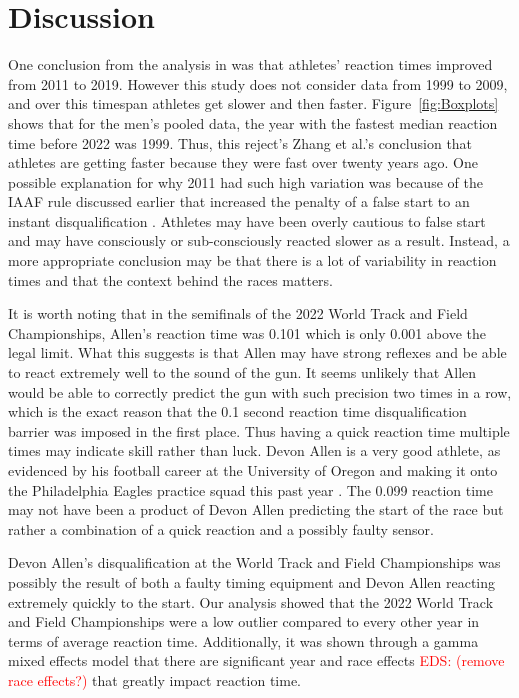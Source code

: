 \documentclass[12pt, letterpaper, titlepage]{article}
\newcommand{\eds}[1]{\textcolor{red}{EDS: (#1)}}
\begin{document}
\section{Discussion}\label{sec:Discussion}

One conclusion from the analysis in \citet{zhang2021correlation} was that 
athletes'
reaction times improved from 2011 to 2019.  However this study does not consider 
data from 1999 to 2009, and over this timespan athletes get slower and then
faster.  Figure~\ref{fig:Boxplots} shows that for the men's pooled data, the 
year with the fastest median reaction time before 2022 was 1999.  Thus, this 
reject's Zhang et al.'s conclusion that athletes are getting faster because they 
were 
fast over twenty years ago. One possible explanation for why 2011 had such
high variation was because of the IAAF rule discussed earlier that increased the
penalty of a false start to an instant disqualification \citep{iaaf2009falsestart}.
Athletes may have been overly cautious to false start and may have consciously
or sub-consciously reacted slower as a result.  Instead, a more appropriate 
conclusion may be that there is a lot of variability in reaction times and that
the context behind the races matters.

It is worth noting that in the semifinals of the 2022 World Track and
Field Championships, Allen's reaction time was 0.101 which is only 0.001 above
the legal limit. What this suggests is that Allen may have strong reflexes
and be able to react extremely well to the sound of the gun. It seems unlikely 
that Allen would be able to correctly predict the gun with such precision two 
times in a row, which is the exact reason that the 0.1 second reaction time 
disqualification barrier was
imposed in the first place. Thus having a quick reaction time multiple times
may indicate skill rather than luck. Devon 
Allen is a very good athlete, as evidenced by his football career at the 
University of Oregon
and making it onto the Philadelphia Eagles practice squad this past year 
\citep{hurley2022eagles}. The 0.099 reaction time may not have been 
a product of Devon Allen predicting the start of the race but rather a 
combination of a quick reaction and a possibly faulty sensor.

Devon Allen's disqualification at the World Track and Field Championships was
possibly the result of both a faulty timing equipment and Devon Allen
reacting extremely quickly to the start.  Our analysis showed that
the 2022 World Track and Field Championships were a low outlier compared to
every other year in terms of average reaction time.  Additionally, it was shown
through a gamma mixed effects model that there are significant year and race
effects \eds{remove race effects?} that greatly impact reaction time.  
\end{document}

